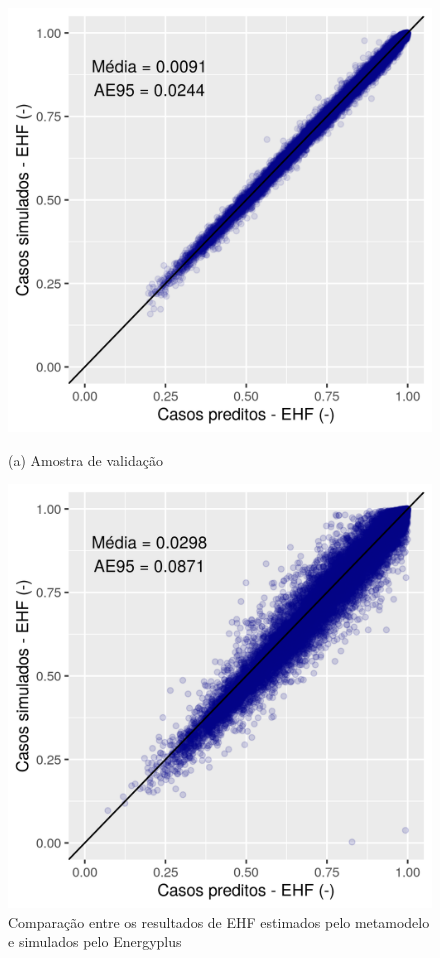 \begin{figure}[h]
	\caption{Comparação entre os resultados de EHF estimados pelo metamodelo e simulados pelo Energyplus}
	\begin{minipage}{.5\textwidth}
		\centering
		\includegraphics[width=1\linewidth]{img/ann_validation.png}
		\begin{center}
			\small{(a) Amostra de validação}
		\end{center}
	\end{minipage}%
	\begin{minipage}{.5\textwidth}
		\centering
		\includegraphics[width=1\linewidth]{img/ann_test.png}

\end{minipage}
\end{figure}
